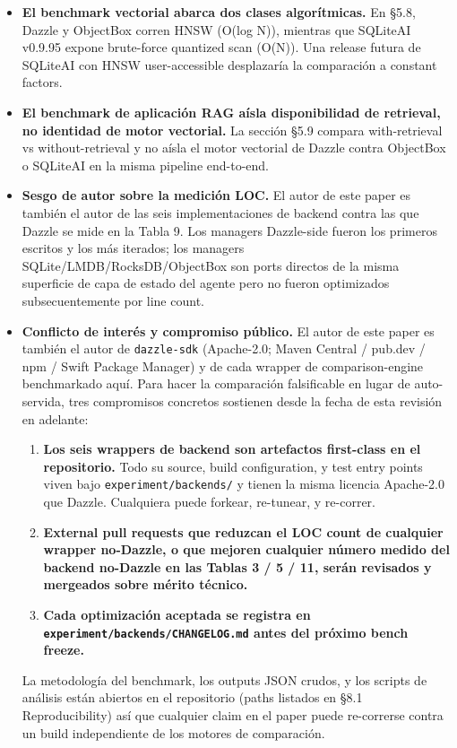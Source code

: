 \begin{itemize}
  vistas materializadas mantenidas manualmente vía triggers cerraría la mayor
  parte del gap medido. La contribución de Dazzle es shipear el patrón
  nativamente, no claimar superioridad algorítmica sobre SQLite.
\item
  \textbf{El benchmark vectorial abarca dos clases algorítmicas.} En §5.8,
  Dazzle y ObjectBox corren HNSW (O(log N)), mientras que SQLiteAI v0.9.95
  expone brute-force quantized scan (O(N)). Una release futura de SQLiteAI con
  HNSW user-accessible desplazaría la comparación a constant factors.
\item
  \textbf{El benchmark de aplicación RAG aísla disponibilidad de retrieval, no
  identidad de motor vectorial.} La sección §5.9 compara with-retrieval vs
  without-retrieval y no aísla el motor vectorial de Dazzle contra ObjectBox o
  SQLiteAI en la misma pipeline end-to-end.
\item
  \textbf{Sesgo de autor sobre la medición LOC.} El autor de este paper es
  también el autor de las seis implementaciones de backend contra las que Dazzle
  se mide en la Tabla 9. Los managers Dazzle-side fueron los primeros escritos y
  los más iterados; los managers SQLite/LMDB/RocksDB/ObjectBox son ports
  directos de la misma superficie de capa de estado del agente pero no fueron
  optimizados subsecuentemente por line count.
\item
  \textbf{Conflicto de interés y compromiso público.} El autor de este paper es
  también el autor de \texttt{dazzle-sdk} (Apache-2.0; Maven Central / pub.dev /
  npm / Swift Package Manager) y de cada wrapper de comparison-engine
  benchmarkado aquí. Para hacer la comparación falsificable en lugar de
  auto-servida, tres compromisos concretos sostienen desde la fecha de esta
  revisión en adelante:

  \begin{enumerate}
  \def\labelenumi{\arabic{enumi}.}
  \tightlist
  \item
    \textbf{Los seis wrappers de backend son artefactos first-class en el
    repositorio.} Todo su source, build configuration, y test entry points viven
    bajo \texttt{experiment/backends/} y tienen la misma licencia Apache-2.0 que
    Dazzle. Cualquiera puede forkear, re-tunear, y re-correr.
  \item
    \textbf{External pull requests que reduzcan el LOC count de cualquier
    wrapper no-Dazzle, o que mejoren cualquier número medido del backend
    no-Dazzle en las Tablas 3 / 5 / 11, serán revisados y mergeados sobre mérito
    técnico.}
  \item
    \textbf{Cada optimización aceptada se registra en
    \texttt{experiment/backends/CHANGELOG.md} antes del próximo bench freeze.}
  \end{enumerate}

  La metodología del benchmark, los outputs JSON crudos, y los scripts de
  análisis están abiertos en el repositorio (paths listados en §8.1
  Reproducibility) así que cualquier claim en el paper puede re-correrse contra
  un build independiente de los motores de comparación.
\end{itemize}

